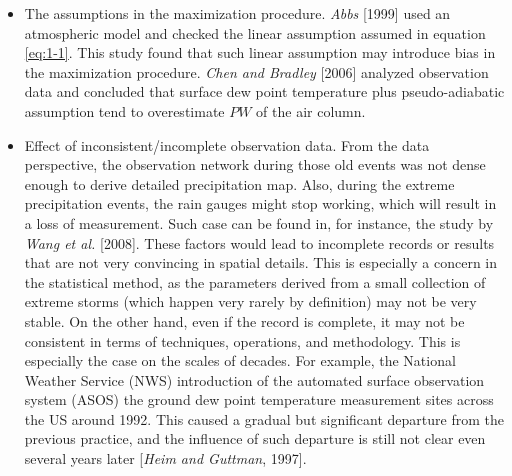 \begin{itemize}
\item The assumptions in the maximization procedure. \textit{Abbs} [1999] used an atmospheric model and checked the linear assumption assumed in equation \ref{eq:1-1}. This study found that such linear assumption may introduce bias in the maximization procedure. \textit{Chen and Bradley} [2006] analyzed observation data and concluded that surface dew point temperature plus pseudo-adiabatic assumption tend to overestimate $PW$ of the air column.

\item Effect of inconsistent/incomplete observation data. From the data perspective, the observation network during those old events was not dense enough to derive detailed precipitation map. Also, during the extreme precipitation events, the rain gauges might stop working, which will result in a loss of measurement. Such case can be found in, for instance, the study by \textit{Wang et al.} [2008]. These factors would lead to incomplete records or results that are not very convincing in spatial details. This is especially a concern in the statistical method, as the parameters derived from a small collection of extreme storms (which happen very rarely by definition) may not be very stable. On the other hand, even if the record is complete, it may not be consistent in terms of techniques, operations, and methodology. This is especially the case on the scales of decades. For example, the National Weather Service (NWS) introduction of the automated surface observation system (ASOS) the ground dew point temperature measurement sites across the US around 1992. This caused a gradual but significant departure from the previous practice, and the influence of such departure is still not clear even several years later [\textit{Heim and Guttman}, 1997].


\end{itemize}
